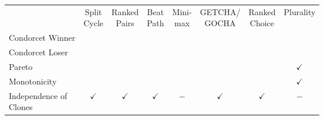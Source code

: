 \documentclass[12pt,xcolor=svgnames,blue,aspectratio=169]{beamer}
\begin{document}
 \begin{frame}
 
 \renewcommand{\arraystretch}{1.3}

\begin{center}{\small \begin{tabular}{l|c|c|c|c|c|c|c|}
 &  \makecell{  Split\\[-2pt] Cycle}  &  \makecell{\textcolor{gray!60}{Ranked}\\[-2pt] \textcolor{gray!50}{Pairs}} & \makecell{\textcolor{gray!60}{Beat}\\[-2pt]\textcolor{gray!60}{Path}} & \makecell{\textcolor{gray!60}{Mini-}\\[-2pt]\textcolor{gray!60}{max}}  &   \makecell{\textcolor{gray!60}{GETCHA/}\\[-2pt]\textcolor{gray!60}{GOCHA}}    &   \makecell{\textcolor{gray!60}{Ranked}\\[-2pt] \textcolor{gray!60}{Choice}} &  \textcolor{gray!60}{Plurality}\\\Xhline{3\arrayrulewidth}
 
{Condorcet Winner} & \cellcolor{gray!50}{$\checkmark$} & \cellcolor{gray!50}{$\checkmark$} & \cellcolor{gray!50}{$\checkmark$} & \cellcolor{gray!50}{$\checkmark$} & \cellcolor{gray!50}{$\checkmark$} & \cellcolor{gray!50}{$-$} &  \cellcolor{gray!50}{$-$} \\\hline

{Condorcet Loser} & \cellcolor{white}{$\checkmark$} & \cellcolor{white}{$\checkmark$}& \cellcolor{white}{$\checkmark$}& \cellcolor{white}{$-$} & \cellcolor{white}{$\checkmark$}& \cellcolor{white}{$\checkmark$} &  \cellcolor{white}{$-$} \\\hline

{Pareto} & \cellcolor{gray!50}{$\checkmark$} & \cellcolor{gray!50}{$\checkmark$}&\cellcolor{gray!50}{$\checkmark$} &\cellcolor{gray!50}{$\checkmark$} & \cellcolor{gray!50}{$-$} & \cellcolor{gray!50}{$\checkmark$} & \cellcolor{gray!50}$\checkmark$\\\hline

{Monotonicity} & \cellcolor{white}{$\checkmark$} & \cellcolor{white}{$\checkmark$}&\cellcolor{white}{$\checkmark$} &\cellcolor{white}{$\checkmark$} & \cellcolor{white}{$\checkmark$} & \cellcolor{white}{$-$} & \cellcolor{white}$\checkmark$\\\hline

\makecell[l]{{Independence of}\\[-2pt] {Clones}} & \cellcolor{gray!50}$\checkmark$&\cellcolor{gray!50}$\checkmark$ &\cellcolor{gray!50}$\checkmark$ &\cellcolor{gray!50}$-$ &\cellcolor{gray!50}$\checkmark$ &\cellcolor{gray!50}$\checkmark$&\cellcolor{gray!50}$-$ \\\hline


\end{tabular}}
\end{center}
\end{frame}
\end{document}
